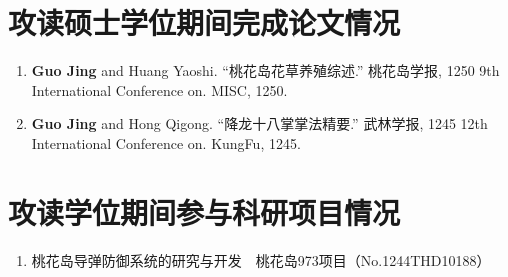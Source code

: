 \chapter{攻读硕士学位期间完成论文情况}

\begin{enumerate}
    \item \textbf{Guo Jing} and Huang Yaoshi. ``桃花岛花草养殖综述.'' 桃花岛学报, 1250 9th International Conference on. MISC, 1250.
    \item \textbf{Guo Jing} and Hong Qigong. ``降龙十八掌掌法精要.'' 武林学报, 1245 12th International Conference on. KungFu, 1245.
\end{enumerate}


\chapter{攻读学位期间参与科研项目情况}

\begin{enumerate}
    \item 桃花岛导弹防御系统的研究与开发~~桃花岛973项目（No.1244THD10188）
\end{enumerate}
